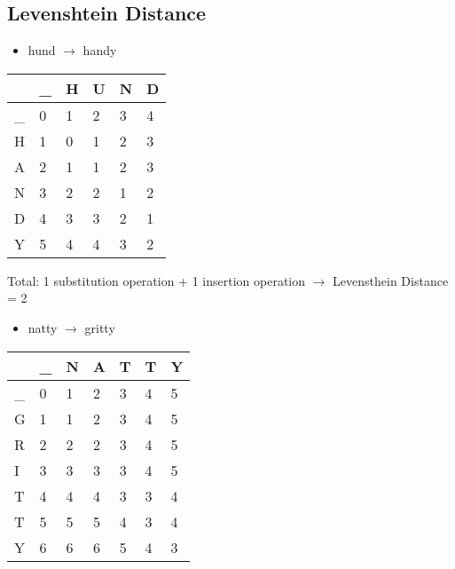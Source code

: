 \documentclass{article}
\begin{document}
	\subsection { Levenshtein Distance }

	\begin{itemize}
	\item hund $\rightarrow$ handy 
	\end{itemize}

	\begin{center}
	\begin{tabular} { | m{1cm} | m{1cm} | m{1cm} | m{1cm} | m{1cm} | m{1cm} | }
		\hline
		 & \_ & H & U & N & D \\
		\hline
		\_ & 0 & 1 & 2 & 3 & 4 \\
		\hline
		H & 1 & 0 & 1 & 2 & 3 \\
		\hline
		A & 2 & 1 & 1 & 2 & 3 \\
		\hline
		N & 3 & 2 & 2 & 1 & 2 \\
		\hline
		D & 4 & 3 & 3 & 2 & 1 \\
		\hline
		Y & 5 & 4 & 4 & 3 & 2  \\
		\hline
	\end{tabular}
	\end{center}
	
	Total: 1 substitution operation + 1 insertion operation $\rightarrow$ Levensthein Distance = 2

	\begin{itemize}
	\item natty $\rightarrow$ gritty 
	\end{itemize}

	\begin{center}
	\begin{tabular} { | m{1cm} | m{1cm} | m{1cm} | m{1cm} | m{1cm} | m{1cm} | m{1cm} | }
		\hline
		 & \_ & N & A & T & T & Y \\
		\hline
		\_ & 0 & 1 & 2 & 3 & 4 & 5 \\
		\hline
		G & 1 & 1 & 2 & 3 & 4  & 5 \\
		\hline
		R & 2 & 2 & 2 & 3 & 4 & 5 \\
		\hline
		I & 3 & 3 & 3 & 3 & 4 & 5  \\
		\hline
		T & 4 & 4 & 4 & 3 & 3 & 4 \\
		\hline
		T & 5 & 5 & 5 & 4 & 3 & 4  \\
		\hline
		Y & 6 & 6 & 6 & 5 & 4 & 3  \\
		\hline
	\end{tabular}
	\end{center}
\end{document}
